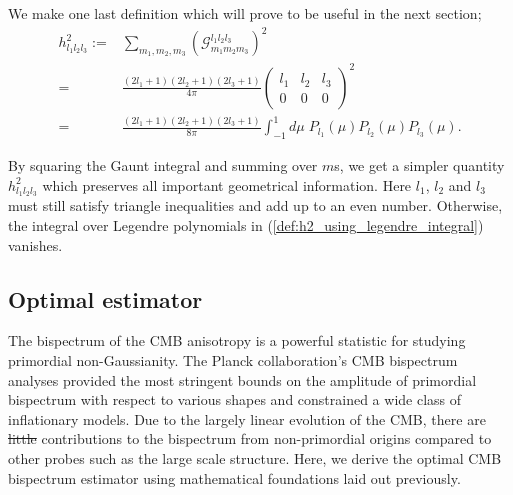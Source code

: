 \documentclass[a4paper,12pt,times,custombib,print,index]{Classes/PhDThesisPSnPDF} %
\providecommand{\DIFadd}[1]{{\protect\color{blue}\uwave{#1}}} %
\providecommand{\DIFdel}[1]{{\protect\color{red}\sout{#1}}}                      %
\providecommand{\DIFaddbegin}{} %
\providecommand{\DIFaddend}{} %
\providecommand{\DIFdelbegin}{} %
\providecommand{\DIFdelend}{} %
\newcommand{\DIFscaledelfig}{0.5}
\newlength{\DIFdelgraphicswidth} %
\newlength{\DIFdelgraphicsheight} %
\newcommand{\DIFaddincludegraphics}[2][]{{\color{blue}\fbox{\DIFOincludegraphics[#1]{#2}}}} %
\newcommand{\DIFdelincludegraphics}[2][]{%
\sbox{\DIFdelgraphicsbox}{\DIFOincludegraphics[#1]{#2}}%
\settoboxwidth{\DIFdelgraphicswidth}{\DIFdelgraphicsbox} %
\settoboxtotalheight{\DIFdelgraphicsheight}{\DIFdelgraphicsbox} %
\scalebox{\DIFscaledelfig}{%
\parbox[b]{\DIFdelgraphicswidth}{\usebox{\DIFdelgraphicsbox}\\[-\baselineskip] \rule{\DIFdelgraphicswidth}{0em}}\llap{\resizebox{\DIFdelgraphicswidth}{\DIFdelgraphicsheight}{%
\setlength{\unitlength}{\DIFdelgraphicswidth}%
\begin{picture}(1,1)%
\thicklines\linethickness{2pt} %
{\color[rgb]{1,0,0}\put(0,0){\framebox(1,1){}}}%
{\color[rgb]{1,0,0}\put(0,0){\line( 1,1){1}}}%
{\color[rgb]{1,0,0}\put(0,1){\line(1,-1){1}}}%
\end{picture}%
}\hspace*{3pt}}} %
} %
\DeclareRobustCommand{\DIFaddbegin}{\DIFOaddbegin \let\includegraphics\DIFaddincludegraphics} %
\DeclareRobustCommand{\DIFaddend}{\DIFOaddend \let\includegraphics\DIFOincludegraphics} %
\DeclareRobustCommand{\DIFdelbegin}{\DIFOdelbegin \let\includegraphics\DIFdelincludegraphics} %
\DeclareRobustCommand{\DIFdelend}{\DIFOaddend \let\includegraphics\DIFOincludegraphics} %
\begin{document}
We make one last definition which will prove to be useful in the next section;
\begin{align}
	h^2_{l_1 l_2 l_3} :=& \sum_{m_1, m_2, m_3} \left( \mathcal{G}^{l_1 l_2 l_3}_{m_1 m_2 m_3} \right)^2  \label{def:h2_using_gaunt_integral}\\
	=& \frac{(2l_1+1)(2l_2+1)(2l_3+1)}{4\pi} { \begin{pmatrix}	l_1 & l_2 & l_3 \\ 0 & 0 & 0 \end{pmatrix} }^2 \\
	=& \frac{(2l_1+1)(2l_2+1)(2l_3+1)}{8\pi} \int_{-1}^{1} d\mu \; P_{l_1}(\mu) P_{l_2}(\mu) P_{l_3}(\mu). \label{def:h2_using_legendre_integral}
\end{align}

By squaring the Gaunt integral and summing over $m$s, we get a simpler quantity $h^2_{l_1 l_2 l_3}$ which preserves all \DIFaddbegin \DIFadd{of the }\DIFaddend important geometrical information. Here $l_1$, $l_2$ and $l_3$ must still satisfy triangle inequalities and add up to an even number. Otherwise, the integral over Legendre polynomials in (\ref{def:h2_using_legendre_integral}) vanishes.

\subsection{Optimal estimator}
The bispectrum of the CMB anisotropy is a powerful statistic for studying primordial non-Gaussianity. The Planck collaboration's CMB bispectrum analyses provided the most stringent bounds on the amplitude of primordial bispectrum with respect to various shapes and constrained a wide class of inflationary models. Due to the largely linear evolution of the CMB, there are \DIFdelbegin \DIFdel{little }\DIFdelend \DIFaddbegin \DIFadd{few }\DIFaddend contributions to the bispectrum from non-primordial origins compared to other probes such as the large scale structure. Here, we derive the optimal CMB bispectrum estimator using mathematical foundations laid out previously.
\end{document}
